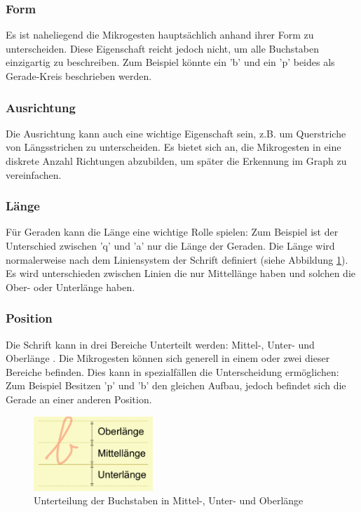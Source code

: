 \subsubsection{Form}
Es ist naheliegend die Mikrogesten hauptsächlich anhand ihrer Form zu unterscheiden. Diese Eigenschaft reicht jedoch nicht, um alle Buchstaben einzigartig zu beschreiben. Zum Beispiel könnte ein 'b' und ein 'p' beides als Gerade-Kreis beschrieben werden. 

\subsubsection{Ausrichtung}
Die Ausrichtung kann auch eine wichtige Eigenschaft sein, z.B. um Querstriche von Längsstrichen zu unterscheiden. Es bietet sich an, die Mikrogesten in eine diskrete Anzahl Richtungen abzubilden, um später die Erkennung im Graph zu vereinfachen.

\subsubsection{Länge}
Für Geraden kann die Länge eine wichtige Rolle spielen: Zum Beispiel ist der Unterschied zwischen 'q' und 'a' nur die Länge der Geraden.  Die Länge wird normalerweise nach dem Liniensystem der Schrift definiert (siehe Abbildung \ref{liniensystem}). Es wird unterschieden zwischen Linien die nur Mittellänge haben und solchen die Ober- oder Unterlänge haben.

\subsubsection{Position}
Die Schrift kann in drei Bereiche Unterteilt werden: Mittel-, Unter- und Oberlänge \cite{typo_linien}. Die Mikrogesten können sich generell in einem oder zwei dieser Bereiche befinden. Dies kann in spezialfällen die Unterscheidung ermöglichen: Zum Beispiel Besitzen 'p' und 'b' den gleichen Aufbau, jedoch befindet sich die Gerade an einer anderen Position.

\begin{figure}[h!]
  \centering
    \includegraphics[width=0.4\textwidth]{./img/liniensystem.pdf}
  \caption{Unterteilung der Buchstaben in Mittel-, Unter- und Oberlänge}
  \label{liniensystem}
\end{figure}

